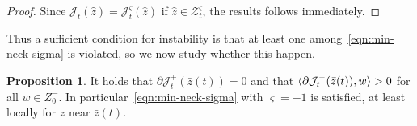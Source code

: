 \documentclass[a4paper,10pt,twoside]{amsbook}
\numberwithin{section}{chapter}
\numberwithin{equation}{chapter}
\theoremstyle{definition}
\newtheorem{prop}{Proposition}[chapter]
\DeclarePairedDelimiter{\dual}{\langle}{\rangle}
\begin{document}
\begin{proof}
Since $\mathcal{J}_t(\hat z)=\mathcal{J}_t^\varsigma(\hat z)$ if $\hat z\in\mathscr{Z}^\varsigma_t$, the results follows immediately.
\end{proof}
Thus a sufficient condition for instability is that at least one among~\eqref{eqn:min-neck-sigma} is violated, so we now study whether this happen.
\begin{prop}
It holds that $\partial\mathcal{J}^+_t(\bar z(t))=0$ and that $\dual{\partial\mathcal{J}^-_t(\bar z(t)),w}>0$ for all $w\in Z_0^-$. In particular~\eqref{eqn:min-neck-sigma} with $\varsigma=-1$ is satisfied, at least locally for $z$ near $\bar z(t)$.
\end{prop}
\end{document}

